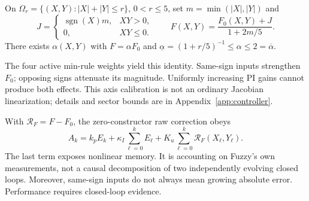 \begin{btdproposition}
\label{prop:fpi_central}
On $\Omega_r=\{(X,Y):|X|+|Y|\le r\}$, $0<r\le5$, set
$m=\min(|X|,|Y|)$ and
\begin{equation}
 J=\begin{cases}\operatorname{sgn}(X)m,&XY>0,\\0,&XY\le0.\end{cases}
 \qquad F(X,Y)=\frac{F_0(X,Y)+J}{1+2m/5}.
 \label{eq:fpi_central}
\end{equation}
There exists $\alpha(X,Y)$ with $F=\alpha F_0$ and
$\underline\alpha=(1+r/5)^{-1}\le\alpha\le2=\overline\alpha$.
\end{btdproposition}
The four active min-rule weights yield this identity. Same-sign
inputs strengthen $F_0$; opposing signs attenuate its magnitude.
Uniformly increasing PI gains cannot produce both effects. This
axis calibration is not an ordinary Jacobian linearization; details
and sector bounds are in Appendix~\ref{app:controller}.

With $\mathcal R_F=F-F_0$, the zero-constructor raw correction obeys
\begin{equation}
 A_k=k_pE_k+\kappa_I\sum_{\ell=0}^kE_\ell
               +K_u\sum_{\ell=0}^k\mathcal R_F(X_\ell,Y_\ell).
 \label{eq:fpd_accounting}
\end{equation}
The last term exposes nonlinear memory. It is accounting on Fuzzy's
own measurements, not a causal decomposition of two independently
evolving closed loops. Moreover, same-sign inputs do not always mean
growing absolute error. Performance requires closed-loop evidence.
